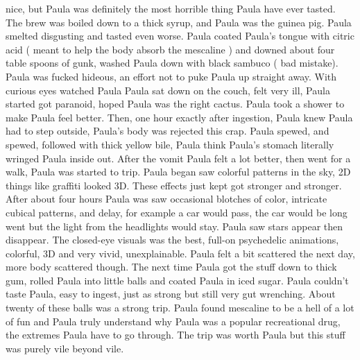 \documentclass[12pt]{book}
\begin{document}
nice, but Paula was definitely the most horrible thing Paula have ever tasted. The brew was boiled down to a thick syrup, and Paula was the guinea pig. Paula smelted disgusting and tasted even worse. Paula coated Paula's tongue with citric acid ( meant to help the body absorb the mescaline ) and downed about four table spoons of gunk, washed Paula down with black sambuco ( bad mistake). Paula was fucked hideous, an effort not to puke Paula up straight away. With curious eyes watched Paula Paula sat down on the couch, felt very ill, Paula started got paranoid, hoped Paula was the right cactus. Paula took a shower to make Paula feel better. Then, one hour exactly after ingestion, Paula knew Paula had to step outside, Paula's body was rejected this crap. Paula spewed, and spewed, followed with thick yellow bile, Paula think Paula's stomach literally wringed Paula inside out. After the vomit Paula felt a lot better, then went for a walk, Paula was started to trip. Paula began saw colorful patterns in the sky, 2D things like graffiti looked 3D. These effects just kept got stronger and stronger. After about four hours Paula was saw occasional blotches of color, intricate cubical patterns, and delay, for example a car would pass, the car would be long went but the light from the headlights would stay. Paula saw stars appear then disappear. The closed-eye visuals was the best, full-on psychedelic animations, colorful, 3D and very vivid, unexplainable. Paula felt a bit scattered the next day, more body scattered though. The next time Paula got the stuff down to thick gum, rolled Paula into little balls and coated Paula in iced sugar. Paula couldn't taste Paula, easy to ingest, just as strong but still very gut wrenching. About twenty of these balls was a strong trip. Paula found mescaline to be a hell of a lot of fun and Paula truly understand why Paula was a popular recreational drug, the extremes Paula have to go through. The trip was worth Paula but this stuff was purely vile beyond vile.
\end{document}
